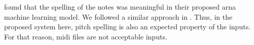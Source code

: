 

\textcite{micchi2020not} found that the spelling of the
notes was meaningful in their proposed \gls{arna} machine
learning model. We followed a similar approach in
\textcite{napoleslopez2021augmentednet}. Thus, in the
proposed system here, pitch spelling is also an expected
property of the inputs. For that reason, \gls{midi} files
are not acceptable inputs.
